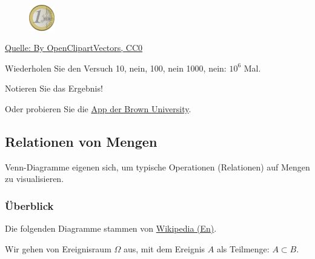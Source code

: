 \documentclass[
  a4paper,
  DIV=11]{scrreprt}
\theoremstyle{definition}
\theoremstyle{remark}
\begin{document}
\begin{figure}

{\centering \includegraphics[width=0.1\textwidth,height=\textheight]{./img/1024px-Coin-155597.svg.png}

}

\end{figure}

\href{https://pixabay.com/pt/moeda-euro-europa-fran\%C3\%A7a-dinheiro-155597}{Quelle:
By OpenClipartVectors, CC0}

Wiederholen Sie den Versuch 10, nein, 100, nein 1000, nein: \(10^6\)
Mal.

Notieren Sie das Ergebnis!

Oder probieren Sie die
\href{https://seeing-theory.brown.edu/basic-probability/index.html\#section1}{App
der Brown University}.

\hypertarget{relationen-von-mengen}{%
\subsection{Relationen von Mengen}\label{relationen-von-mengen}}

Venn-Diagramme eigenen sich, um typische Operationen (Relationen) auf
Mengen zu visualisieren.

\hypertarget{uxfcberblick}{%
\subsubsection{Überblick}\label{uxfcberblick}}

Die folgenden Diagramme stammen von
\href{https://en.wikipedia.org/wiki/Venn_diagram}{Wikipedia (En)}.

Wir gehen von Ereignisraum \(\Omega\) aus, mit dem Ereignis \(A\) als
Teilmenge: \(A \subset B\).
\end{document}
